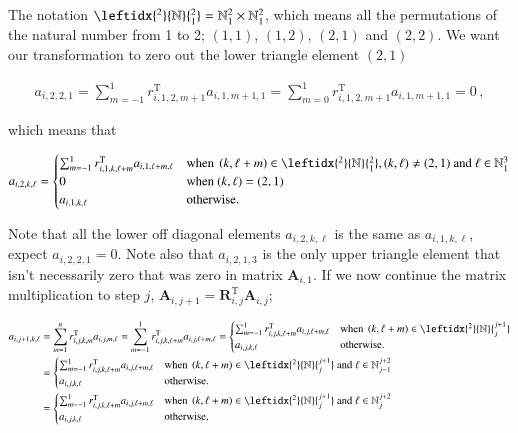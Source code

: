 \documentclass[11pt,english,a4paper]{article}
\begin{document}
\begin{flushleft}
The notation $\leftidx{^2}{\mathbb{N}}{_1^2} = \mathbb{N}_1^2 \times \mathbb{N}_1^2$, which means all the permutations of the natural number from 1 to 2; $(1,1)$, $(1,2)$, $(2,1)$ and $(2,2)$. We want our transformation to zero out the lower triangle element $(2,1)$

\begin{align*}
a_{i,2,2,1} = \sum_{m=-1}^1 r_{i,1,2,m+1}^{\text{T}} a_{i,1,m+1,1} = \sum_{m=0}^1 r_{i,1,2,m+1}^{\text{T}} a_{i,1,m+1,1} = 0\,,
\end{align*}

which means that 

\begin{align*}
a_{i,2,k,\ell} = \begin{cases} \sum_{m=-1}^1 r_{i,1,k,\ell+m}^{\text{T}} a_{i,1,\ell+m,\ell} & \text{when } \p{k,\ell+m}\in{\leftidx{^2}{\mathbb{N}}{_1^2}}, (k,\ell)\neq(2,1) \text{ and } \ell \in\mathbb{N}_1^3\\ 0 & \text{when } (k,\ell)=(2,1) \\ a_{i,1,k,\ell} & \text{otherwise.}\end{cases}
\end{align*}

Note that all the lower off diagonal elements  $a_{i,2,k,\ell}$ is the same as $a_{i,1,k,\ell}$, expect $a_{i,2,2,1} = 0$. Note also that $a_{i,2,1,3}$ is the only upper triangle element that isn't necessarily zero that was zero in matrix $\textbf{A}_{i,1}$. If we now continue the matrix multiplication to step $j$, $\textbf{A}_{i,j+1} = \textbf{R}_{i,j}^{\text{T}} \textbf{A}_{i,j}$;

\begin{align*}
a_{i,j+1,k,\ell} &= \sum_{m=1}^n r_{i,j,k,m}^{\text{T}} a_{i,j,m,\ell} = \sum_{m=-1}^1 r_{i,j,k,\ell+m}^{\text{T}} a_{i,j,\ell+m,\ell} 
= \begin{cases} \sum_{m=-1}^1 r_{i,j,k,\ell+m}^{\text{T}} a_{i,j,\ell+m,\ell} & \text{when } \p{k,\ell+m}\in{\leftidx{^2}{\mathbb{N}}{_j^{j+1}}}\\ a_{i,j,k,\ell} & \text{otherwise.}\end{cases}
\\
&= \begin{cases} \sum_{m=-1}^1 r_{i,j,k,\ell+m}^{\text{T}} a_{i,j,\ell+m,\ell} & \text{when } \p{k,\ell+m}\in{\leftidx{^2}{\mathbb{N}}{_j^{j+1}}} \text{ and } \ell \in\mathbb{N}_{j-1}^{j+2}\\ a_{i,j,k,\ell} & \text{otherwise.}\end{cases}
\\
&= \begin{cases} \sum_{m=-1}^1 r_{i,j,k,\ell+m}^{\text{T}} a_{i,j,\ell+m,\ell} & \text{when } \p{k,\ell+m}\in{\leftidx{^2}{\mathbb{N}}{_j^{j+1}}} \text{ and } \ell \in\mathbb{N}_{j}^{j+2}\\ a_{i,j,k,\ell} & \text{otherwise,}\end{cases}
\end{align*}


\end{flushleft}
\end{document}
